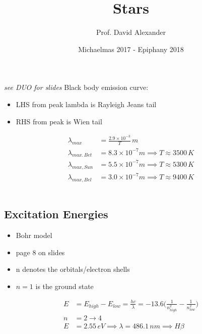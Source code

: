 \documentclass[a4paper,11pt,normalem]{article}
\title{Stars}
\author{Prof. David Alexander}
\date{Michaelmas 2017 - Epiphany 2018}
\begin{document}
\maketitle
\tableofcontents
\section{}
\emph{see DUO for slides}
Black body emission curve:
    \begin{itemize}
        \item LHS from peak lambda is Rayleigh Jeans tail
        \item RHS from peak is Wien tail
    \end{itemize}

\begin{align}
    \lambda_{max} &= \frac{2.9 \times 10^{-3}}{T} \, m \\
    \lambda_{max.\,Bet} &= 8.3 \times 10^{-7}m \implies T \approx 3500\,K \\
    \lambda_{max,Sun} &= 5.5 \times 10^{-7}m \implies T \approx 5300\,K \\
    \lambda_{max, Bel} &= 3.0 \times 10^{-7} m \implies T \approx 9400\,K\\
\end{align}

\section{}

\subsection{Excitation Energies}
\begin{itemize}
    \item Bohr model
    \item page 8 on slides
    \item n denotes the orbitals/electron shells
    \item $n = 1$ is the ground state
\end{itemize}

\begin{align}
    E &= E_{high} - E_{low} = \frac{hc}{\lambda} = -13.6\Big(\frac{1}{n_{high}^2} - \frac{1}{n_{low}^2} \Big) \\
    n &= 2 \to 4 \\
    E &= 2.55\,eV \implies \lambda = 486.1\,nm \implies H\beta
\end{align}
\end{document}
